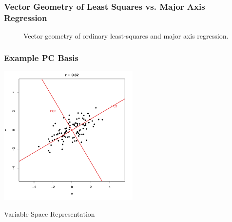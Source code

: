 \documentclass{beamer}
\begin{document}
\begin{frame}
  \frametitle{Vector Geometry of Least Squares vs. Major Axis Regression}

\begin{figure}
\begin{center}
\end{center}
\caption{Vector geometry of ordinary least-squares and major axis regression.}
\end{figure}

\end{frame}



\begin{frame}
  \frametitle{Example PC Basis}

\begin{center}
\includegraphics[height=2.75in]{fig-bivariate-pca.pdf}
\smallskip

Variable Space Representation

\end{center}  


\end{frame}
\end{document}

